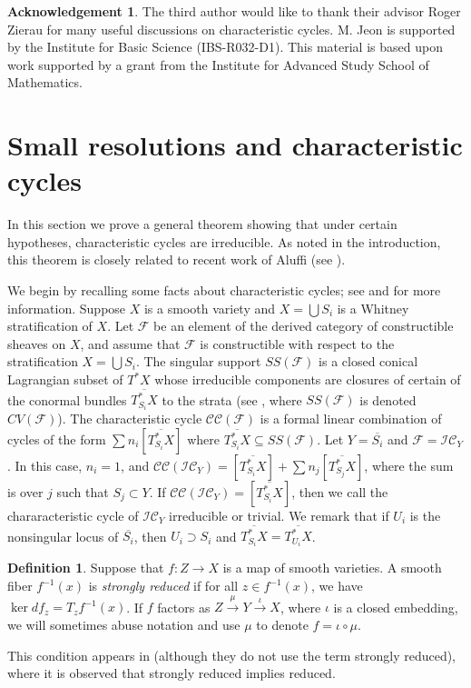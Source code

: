 \documentclass[11pt,letterpaper,reqno]{amsart}
\newcommand{\cC}{\mathcal C}
\newcommand{\cF}{\mathcal F}
\newcommand{\cI}{\mathcal I}
\newcommand{\IC}{\cI \cC}
\newcommand{\CC}{\cC \cC}
\numberwithin{equation}{section}
\theoremstyle{plain}
\theoremstyle{definition}
\newtheorem{definition}[theorem]{Definition}
\newtheorem*{ack}{Acknowledgement}
\theoremstyle{remark}
\begin{document}
\begin{ack}
The third author would like to thank their advisor Roger Zierau for many useful discussions on characteristic cycles. M. Jeon is supported by the Institute for Basic Science (IBS-R032-D1).
This material is based upon work supported by a grant from the Institute for Advanced Study School of Mathematics.
\end{ack}

\section{Small resolutions and characteristic cycles} \label{s:small-charcycle}
In this section we prove a general theorem showing that under certain hypotheses, characteristic cycles
are irreducible.  As noted in the introduction, this theorem is closely related to recent work
of Aluffi (see \cite{Aluffi2025}).  

We begin by recalling some facts about characteristic cycles; see \cite{KS} and \cite{Dim04} for more information.
Suppose $X$ is a smooth variety and $X = \bigcup S_i$ is a Whitney stratification of $X$.  Let $\cF$ be an element of the
derived category of constructible sheaves on $X$, and assume that $\cF$ is constructible with respect to the  stratification $X = \bigcup S_i$.
The  singular support $SS(\cF)$ is a closed conical Lagrangian subset of $T^* X$ whose irreducible components
are closures of certain of the conormal bundles $\overline{T^*_{S_i}X}$ to the strata (see \cite[Section 4.3]{Dim04}, where
$SS(\cF)$ is denoted $CV(\cF)$).
The characteristic cycle $\CC(\cF)$ is a formal linear combination of cycles
of the form $\sum n_i [\overline{T^*_{S_i}X}]$ where $\overline{T^*_{S_i}X} \subseteq SS(\cF)$.
Let $Y = \overline{S_i}$ and $\cF = \IC_Y$.  In this case, $n_i =1$, and
$\CC(\IC_Y) =  [\overline{T^*_{S_i}X}] + \sum n_j [\overline{T^*_{S_j}X}]$, where the sum is over $j$ such
that $S_j \subset Y$.  If $\CC(\IC_Y) = [\overline{T^*_{S_i}X}]$, then we call the chararacteristic cycle of $\IC_Y$
irreducible or trivial.  We remark that if $U_i$ is the nonsingular locus of $\overline{S_i}$, then $U_i \supset S_i$ and
$\overline{T^*_{S_i}X} = \overline{T^*_{U_i}X}$.


\begin{definition}
Suppose that $f: Z \to X$ is a map of smooth varieties.  A smooth fiber $f^{-1}(x)$ is {\it strongly reduced}
if for all $z \in f^{-1}(x)$, we have
$\ker df_z = T_z f^{-1}(x)$.  If $f$ factors as
$Z \stackrel{\mu}{\rightarrow} Y\stackrel{\iota}{\rightarrow} X$, where $\iota$ is a closed embedding, 
we will sometimes abuse notation and use $\mu$ to denote $f = \iota \circ \mu$.
\end{definition}
This condition appears in \cite[Remark 2.12]{BE} (although they do not use the term strongly reduced), where it is
observed that strongly reduced implies reduced.  
\end{document}
